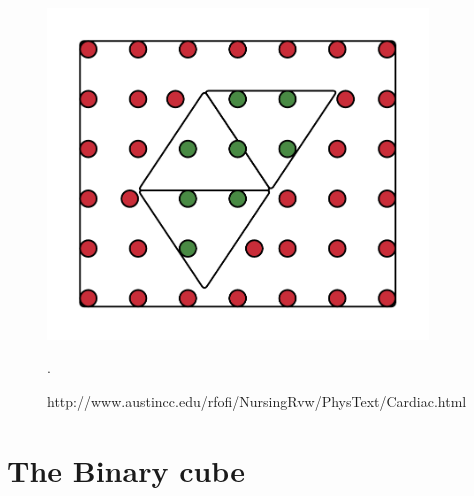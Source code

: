 \begin{figure}[h]
 \centering 
     \includegraphics[width=0.9\textwidth]{bilder/m_points_inside}
     \caption{http://www.austincc.edu/rfofi/NursingRvw/PhysText/Cardiac.html}.
     \label{m_points_inside.png}
\end{figure}


\section{The Binary cube}





